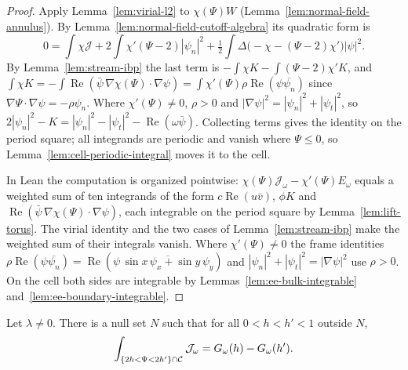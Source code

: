 \begin{proof}
\leanok
Apply Lemma~\ref{lem:virial-l2} to $\chi(\Psi)W$ (Lemma~\ref{lem:normal-field-annulus}). By
Lemma~\ref{lem:normal-field-cutoff-algebra} its quadratic form is
\[
  0=\int\chi\mathcal J+2\int\chi'(\Psi-2)|\psi_n|^2
    +\tfrac12\int\Delta\bigl(-\chi-(\Psi-2)\chi'\bigr)|\psi|^2 .
\]
By Lemma~\ref{lem:stream-ibp} the last term is $-\int\chi K-\int(\Psi-2)\chi'K$, and
$\int\chi K=-\int\operatorname{Re}(\bar\psi\,\nabla\chi(\Psi)\cdot\nabla\psi)
=\int\chi'(\Psi)\rho\operatorname{Re}(\psi\overline{\psi_n})$ since $\nabla\Psi\cdot\nabla\psi=-\rho\psi_n$.
Where $\chi'(\Psi)\ne0$, $\rho>0$ and $|\nabla\psi|^2=|\psi_n|^2+|\psi_t|^2$, so
$2|\psi_n|^2-K=|\psi_n|^2-|\psi_t|^2-\operatorname{Re}(\omega\bar\psi)$. Collecting terms gives the
identity on the period square; all integrands are periodic and vanish where $\Psi\le0$, so
Lemma~\ref{lem:cell-periodic-integral} moves it to the cell.

In Lean the computation is organized pointwise: $\chi(\Psi)\mathcal J_\omega-\chi'(\Psi)E_\omega$
equals a weighted sum of ten integrands of the form $c\operatorname{Re}(u\bar v)$, $\phi K$
and $\operatorname{Re}(\bar\psi\,\nabla\chi(\Psi)\cdot\nabla\psi)$, each integrable on the
period square by Lemma~\ref{lem:lift-torus}. The virial identity and the two cases of
Lemma~\ref{lem:stream-ibp} make the weighted sum of their integrals vanish. Where
$\chi'(\Psi)\ne0$ the frame identities $\rho\operatorname{Re}(\psi\overline{\psi_n})
=\operatorname{Re}(\psi\,\overline{\sin x\,\psi_x+\sin y\,\psi_y})$ and
$|\psi_n|^2+|\psi_t|^2=|\nabla\psi|^2$ use $\rho>0$. On the cell both sides are integrable by
Lemmas~\ref{lem:ee-bulk-integrable} and~\ref{lem:ee-boundary-integrable}.
\end{proof}

\begin{lemma}
\label{lem:ee-annular-virial}
\leanok
Let $\lambda\ne0$. There is a null set $N$ such that for all $0<h<h'<1$ outside $N$,
\[
  \int_{\{2h<\Psi<2h'\}\cap\mathcal{C}}\mathcal J_\omega=G_\omega(h)-G_\omega(h').
\]
\end{lemma}


